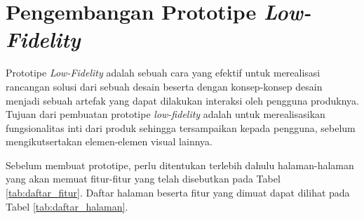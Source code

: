 \section{Pengembangan Prototipe \textit{Low-Fidelity}}
\label{sec:lofi}

Prototipe \textit{Low-Fidelity} adalah sebuah cara yang efektif untuk merealisasi rancangan solusi dari sebuah desain beserta dengan konsep-konsep desain menjadi sebuah artefak yang dapat dilakukan interaksi oleh pengguna produknya. \parencite{adobe2017prototype} Tujuan dari pembuatan prototipe \textit{low-fidelity} adalah untuk merealisasikan fungsionalitas inti dari produk sehingga tersampaikan kepada pengguna, sebelum mengikutsertakan elemen-elemen visual lainnya. 

Sebelum membuat prototipe, perlu ditentukan terlebih dahulu halaman-halaman yang akan memuat fitur-fitur yang telah disebutkan pada Tabel \ref{tab:daftar_fitur}. Daftar halaman beserta fitur yang dimuat dapat dilihat pada Tabel \ref{tab:daftar_halaman}.


